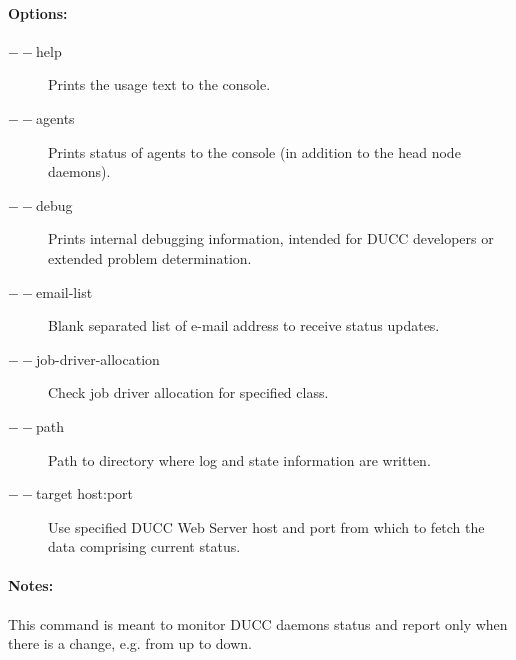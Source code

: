   \paragraph{Options:}
    \begin{description}
    	\item[$--$help]
          Prints the usage text to the console. 
        \item[$--$agents]
          Prints status of agents to the console (in addition to the head node daemons). 
        \item[$--$debug]          
          Prints internal debugging information, intended for DUCC developers or extended problem determination.      
        \item[$--$email-list]          
          Blank separated list of e-mail address to receive status updates.  
        \item[$--$job-driver-allocation]          
          Check job driver allocation for specified class.     
        \item[$--$path]          
          Path to directory where log and state information are written.  
        \item[$--$target host:port]          
          Use specified DUCC Web Server host and port from which to fetch the data comprising current status.                                                                                               
     \end{description}
            
  \paragraph{Notes:}
    This command is meant to monitor DUCC daemons status and report only when there is a change, e.g. from up to down.
       